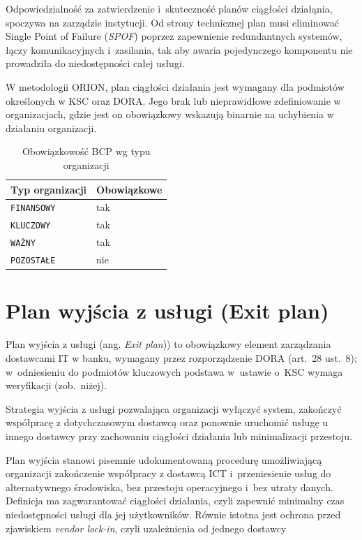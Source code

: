 Odpowiedzialność za zatwierdzenie i~skuteczność planów ciągłości działąnia, spoczywa na zarządzie instytucji. Od strony technicznej plan musi eliminować Single Point of Failure (\textit{SPOF}) poprzez zapewnienie redundantnych systemów, łączy komunikacyjnych i~zasilania, tak aby awaria pojedynczego komponentu nie prowadziła do niedostępności całej usługi.

W metodologii ORION, plan ciągłości działania jest wymagany dla podmiotów określonych w KSC oraz DORA. Jego brak lub nieprawidłowe zdefiniowanie w organizacjach, gdzie jest on obowiązkowy wskazują binarnie na uchybienia w działaniu organizacji.

\begin{table}[H]
\centering
\caption{Obowiązkowość BCP wg typu organizacji}
\label{tab:bcp-wagi}
\renewcommand{\arraystretch}{1.4}
\begin{tabular}{p{4.5cm}p{4.5cm}}
\toprule
\textbf{Typ organizacji} & \textbf{Obowiązkowe}\\
\midrule
\texttt{FINANSOWY} & tak\\
\midrule
\texttt{KLUCZOWY} & tak\\
\midrule
\texttt{WAŻNY} & tak\\
\midrule
\texttt{POZOSTAŁE} & nie \\
\bottomrule
\end{tabular}
\end{table}

\section{Plan wyjścia z usługi (Exit plan)}

Plan wyjścia z usługi (ang. \textit{Exit plan})) to obowiązkowy element zarządzania dostawcami IT w banku, wymagany przez rozporządzenie DORA (art.~28 ust.~8\autocite{dora2022}); w~odniesieniu do podmiotów kluczowych podstawa w~ustawie o~KSC wymaga weryfikacji (zob.\ niżej).

\begin{definition}
Strategia wyjścia z usługi pozwalająca organizacji wyłączyć system, zakończyć współpracę z dotychczasowym dostawcą oraz ponownie uruchomić usługę u innego dostawcy przy zachowaniu ciągłości działania lub minimalizacji przestoju.
\end{definition}

Plan wyjścia stanowi pisemnie udokumentowaną procedurę umożliwiającą organizacji zakończenie współpracy z dostawcą ICT i~przeniesienie usług do alternatywnego środowiska, bez przestoju operacyjnego i~bez utraty danych. Definicja ma zagwarantować ciągłości działania, czyli zapewnić minimalny czas niedostępności usługi dla jej użytkowników. Równie istotna jest ochrona przed zjawiskiem \textit{vendor lock-in}, czyli uzależnienia od jednego dostawcy

